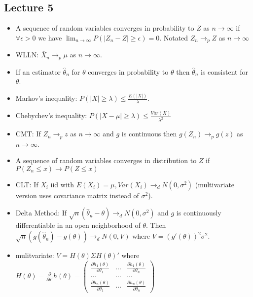 \documentclass[11pt]{article} %
\begin{document}
\subsection{Lecture 5}
\begin{itemize}
\item A sequence of random variables converges in probability to $Z$ as $n \rightarrow \infty$ if $\forall \epsilon>0$ we have $\lim_{n\rightarrow \infty}P(|Z_n - Z|\geq \epsilon) = 0.$ Notated $Z_n \rightarrow_p Z$ as $n \rightarrow \infty$
\item WLLN: $\bar{X}_n \rightarrow_p \mu$ as $n\rightarrow \infty$.
\item If an estimator $\hat{\theta}_n$ for $\theta$ converges in probability to $\theta$ then $\hat{\theta}_n$ is consistent for $\theta$.
\item Markov's inequality: $P(|X|\geq \lambda) \leq \frac{E(|X|)}{\lambda}$.
\item Chebychev's inequality: $P(|X - \mu| \geq \lambda) \leq \frac{Var(X)}{\lambda^2}$
\item CMT: If $Z_n \rightarrow_p z $ as $n\rightarrow \infty$ and $g$ is continuous then $g(Z_n) \rightarrow_p g(z)$ as $n\rightarrow \infty$.
\item A sequence of random variables converges in distribution to $Z$ if $P(Z_n\leq x)\rightarrow P(Z\leq x)$
\item CLT: If $X_i$ iid with $E(X_i) = \mu,Var(X_i) \rightarrow_d N(0,\sigma^2)$ (multivariate version uses covariance matrix instead of $\sigma^2$).
\item Delta Method: If $\sqrt{n}(\hat{\theta}_n - \theta) \rightarrow_d N(0,\sigma^2)$ and $g$ is continuously differentiable in an open neighborhood of $\theta$. Then $\sqrt{n}(g(\hat{\theta}_n) - g(\theta))\rightarrow_d N(0,V)$ where $V = (g'(\theta))^2\sigma^2$.
\item mulitvariate: $V = H(\theta)\Sigma H(\theta)'$ where $H(\theta) = \frac{\partial}{\partial \theta'}h(\theta) = \begin{pmatrix} \frac{\partial h_1(\theta)}{\partial \theta_1} & \dots &  \frac{\partial h_1(\theta)}{\partial \theta_n} \\ \dots & \dots & \dots \\  \frac{\partial h_n(\theta)}{\partial \theta_1} & \dots &  \frac{\partial h_n(\theta)}{\partial \theta_n} \end{pmatrix}$
\end{itemize}
\end{document}
